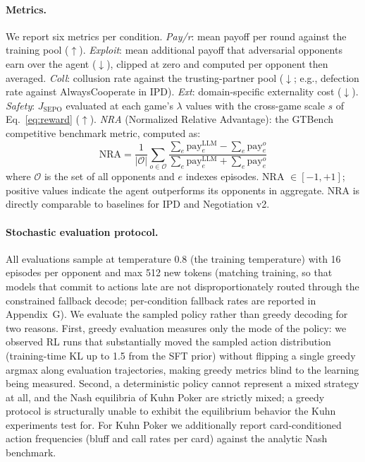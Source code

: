 \documentclass[letterpaper]{article} %
\newcommand{\Jsepo}{J_{\text{SEPO}}}
\begin{document}
\paragraph{Metrics.} We report six metrics per condition. \textit{Pay/r}: mean payoff per round against the training pool ($\uparrow$). \textit{Exploit}: mean additional payoff that adversarial opponents earn over the agent ($\downarrow$), clipped at zero and computed per opponent then averaged. \textit{Coll}: collusion rate against the trusting-partner pool ($\downarrow$; e.g., defection rate against AlwaysCooperate in IPD). \textit{Ext}: domain-specific externality cost ($\downarrow$). \textit{Safety}: $\Jsepo$ evaluated at each game's $\lambda$ values with the cross-game scale $s$ of Eq.~\ref{eq:reward} ($\uparrow$). \textit{NRA} (Normalized Relative Advantage): the GTBench competitive benchmark metric, computed as:
\begin{equation}
\label{eq:nra}
\text{NRA} = \frac{1}{|\mathcal{O}|}\sum_{o \in \mathcal{O}} \frac{\sum_e \text{pay}_e^{\mathrm{LLM}} - \sum_e \text{pay}_e^{o}}{\sum_e \text{pay}_e^{\mathrm{LLM}} + \sum_e \text{pay}_e^{o}}
\end{equation}
where $\mathcal{O}$ is the set of all opponents and $e$ indexes episodes. NRA $\in [-1, +1]$; positive values indicate the agent outperforms its opponents in aggregate. NRA is directly comparable to \citet{wu2024gtbench} baselines for IPD and Negotiation v2.
\paragraph{Stochastic evaluation protocol.} All evaluations sample at temperature 0.8 (the training temperature) with 16 episodes per opponent and max 512 new tokens (matching training, so that models that commit to actions late are not disproportionately routed through the constrained fallback decode; per-condition fallback rates are reported in Appendix~G). We evaluate the sampled policy rather than greedy decoding for two reasons. First, greedy evaluation measures only the mode of the policy: we observed RL runs that substantially moved the sampled action distribution (training-time KL up to 1.5 from the SFT prior) without flipping a single greedy argmax along evaluation trajectories, making greedy metrics blind to the learning being measured. Second, a deterministic policy cannot represent a mixed strategy at all, and the Nash equilibria of Kuhn Poker are strictly mixed; a greedy protocol is structurally unable to exhibit the equilibrium behavior the Kuhn experiments test for. For Kuhn Poker we additionally report card-conditioned action frequencies (bluff and call rates per card) against the analytic Nash benchmark.
\end{document}
